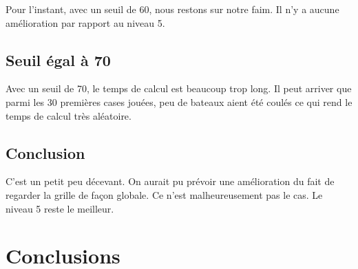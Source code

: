 \begin{center}
\end{center}

Pour l'instant, avec un seuil de 60, nous restons sur notre faim. Il n'y a aucune amélioration par rapport au niveau 5.



\newpage

\subsection{Seuil égal à 70}
Avec un seuil de 70, le temps de calcul est beaucoup trop long. Il peut arriver que parmi les 30 premières cases jouées, peu de bateaux aient été coulés ce qui rend le temps de calcul très aléatoire.
\subsection{Conclusion}
C'est un petit peu décevant. On aurait pu prévoir une amélioration du fait de regarder la grille de façon globale. Ce n'est malheureusement pas le cas. Le niveau 5 reste le meilleur.

\newpage


\section{Conclusions}

